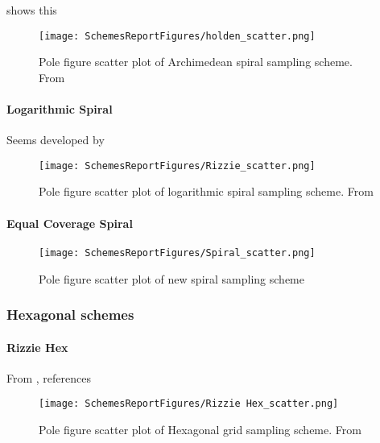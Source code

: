 \documentclass{article}
\begin{document}
\cite{klug_x-ray_1974} shows this

\begin{figure}[H]
    \centering
    \texttt{[image: SchemesReportFigures/holden\_scatter.png]}
    \caption{Pole figure scatter plot of Archimedean spiral sampling scheme. From \cite{Holden}}
\end{figure}

\paragraph{Logarithmic Spiral}

Seems developed by \citep{rizzie_elaboration_2008} 

\begin{figure}[H]
    \centering
    \texttt{[image: SchemesReportFigures/Rizzie\_scatter.png]}
    \caption{Pole figure scatter plot of logarithmic spiral sampling scheme. From \cite{rizzie_elaboration_2008} }
\end{figure}



\paragraph{Equal Coverage Spiral}



\begin{figure}[H]
    \centering
    \texttt{[image: SchemesReportFigures/Spiral\_scatter.png]}
    \caption{Pole figure scatter plot of new spiral sampling scheme}
\end{figure}


\subsubsection{Hexagonal schemes}

\paragraph{Rizzie Hex}
From \citep{rizzie_elaboration_2008}, references \cite{matthies_optimization_1992}

\begin{figure}[H]
    \centering
    \texttt{[image: SchemesReportFigures/Rizzie Hex\_scatter.png]}
    \caption{Pole figure scatter plot of Hexagonal grid sampling scheme. From \cite{rizzie_elaboration_2008}}
\end{figure}
\end{document}
